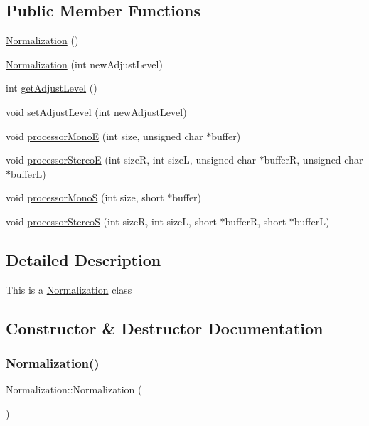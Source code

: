 \subsection*{Public Member Functions}
\begin{DoxyCompactItemize}
\item 
\hyperlink{classNormalization_a7998284e5456d915ebdb2520e4d74250}{Normalization} ()
\item 
\hyperlink{classNormalization_ac4807a0ce2a2d845bd0a8fd0f1fac662}{Normalization} (int new\+Adjust\+Level)
\item 
int \hyperlink{classNormalization_a8e62b273415300146b260ec18561a448}{get\+Adjust\+Level} ()
\item 
void \hyperlink{classNormalization_a4f80ce5334c763075e612688c03edd58}{set\+Adjust\+Level} (int new\+Adjust\+Level)
\item 
void \hyperlink{classNormalization_a61d6afdd8530c60ef098c2e404841683}{processor\+MonoE} (int size, unsigned char $\ast$buffer)
\item 
void \hyperlink{classNormalization_a27a14c9e1a86b55db654335e79c89782}{processor\+StereoE} (int sizeR, int sizeL, unsigned char $\ast$bufferR, unsigned char $\ast$bufferL)
\item 
void \hyperlink{classNormalization_a432fc3b7ef40314bb4d7a215fddc8d0b}{processor\+MonoS} (int size, short $\ast$buffer)
\item 
void \hyperlink{classNormalization_a3221f7132aa5feabc417fbf9ce97e290}{processor\+StereoS} (int sizeR, int sizeL, short $\ast$bufferR, short $\ast$bufferL)
\end{DoxyCompactItemize}


\subsection{Detailed Description}
This is a \hyperlink{classNormalization}{Normalization} class 

\subsection{Constructor \& Destructor Documentation}
\mbox{\label{classNormalization_a7998284e5456d915ebdb2520e4d74250}} 
\subsubsection{\texorpdfstring{Normalization()}{Normalization()}\hspace{0.1cm}{\footnotesize\ttfamily [1/2]}}
{\footnotesize\ttfamily Normalization\+::\+Normalization (\begin{DoxyParamCaption}{ }\end{DoxyParamCaption})}


